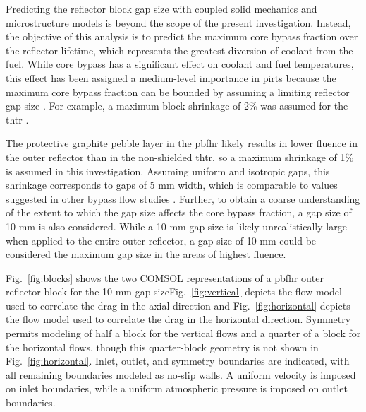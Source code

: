 Predicting the reflector block gap size with coupled solid mechanics and microstructure models is beyond the scope of the present investigation. Instead, the objective of this analysis is to predict the maximum core bypass fraction over the reflector lifetime, which represents the greatest diversion of coolant from the fuel. While core bypass has a significant effect on coolant and fuel temperatures, this effect has been assigned a medium-level importance in \glspl{pirt} because the maximum core bypass fraction can be bounded by assuming a limiting reflector gap size \cite{gou_2018}. For example, a maximum block shrinkage of 2\% was assumed for the \gls{thtr} \cite{oehme}.

The protective graphite pebble layer in the \gls{pbfhr} likely results in lower fluence in the outer reflector than in the non-shielded \gls{thtr}, so a maximum shrinkage of 1\% is assumed in this investigation. Assuming uniform and isotropic gaps, this shrinkage corresponds to gaps of 5 \si{\milli\meter} width, which is comparable to values suggested in other bypass flow studies \cite{liu_2018, viljoen,jun2011}. Further, to obtain a coarse understanding of the extent to which the gap size affects the core bypass fraction, a gap size of 10 \si{\milli\meter} is also considered. While a 10 \si{\milli\meter} gap size is likely unrealistically large when applied to the entire outer reflector, a gap size of 10 \si{\milli\meter} could be considered the maximum gap size in the areas of highest fluence.

Fig.\ \ref{fig:blocks} shows the two COMSOL representations of a \gls{pbfhr} outer reflector block for the 10 \si{\milli\meter} gap size\mdash Fig.\ \ref{fig:vertical} depicts the flow model used to correlate the drag in the axial direction and Fig.\ \ref{fig:horizontal} depicts the flow model used to correlate the drag in the horizontal direction. Symmetry permits modeling of half a block for the vertical flows and a quarter of a block for the horizontal flows, though this quarter-block geometry is not shown in Fig.\ \ref{fig:horizontal}. Inlet, outlet, and symmetry boundaries are indicated, with all remaining boundaries modeled as no-slip walls. A uniform velocity is imposed on inlet boundaries, while a uniform atmospheric pressure is imposed on outlet boundaries.

